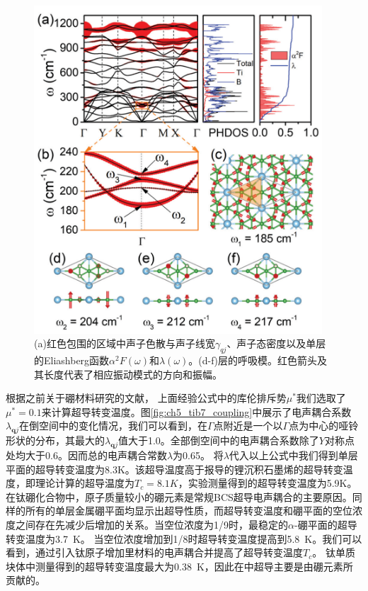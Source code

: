 \begin{figure}
  \includegraphics[width=0.96\textwidth]{figs/ch5_tib7_sc_all.png}
  \centering
  \caption{(a)红色包围的区域中声子色散与声子线宽$\gamma_{qj}$、声子态密度以及单层的Eliashberg函数$\alpha^2 F(\omega)$和$\lambda(\omega)$。(d-f)层的呼吸模。红色箭头及其长度代表了相应振动模式的方向和振幅。}
  \label{fig:ch5_tib7_sc_all}
\end{figure}

根据之前关于硼材料研究的文献\cite{penev2016can,zhao2016superconductivity,zhao2018multigap,liao2017phonon,yan2020superconductivity}，
上面经验公式中的库伦排斥势$\mu^*$我们选取了$\mu^*=0.1$来计算超导转变温度。图\ref{fig:ch5_tib7_coupling}中展示了电声耦合系数$\lambda_{\bm{q}j}$在倒空间中的变化情况，我们可以看到，在$\Gamma$点附近是一个以$\Gamma$点为中心的哑铃形状的分布，其最大的$\lambda_{\bm{q}j}$值大于\num{1.0}。全部倒空间中的电声耦合系数除了$Y$对称点处均大于\num{0.6}。因而总的电声耦合常数$\lambda$为\num{0.65}。
将$\lambda$代入以上公式中我们得到单层平面的超导转变温度为\num{8.3}K。该超导温度高于报导的锂沉积石墨烯的超导转变温度，即理论计算的超导温度为$T_c=8.1K$\cite{profeta2012phonon}，实验测量得到的超导转变温度为\num{5.9}K\cite{ludbrook2015evidence}。
在钛硼化合物中，原子质量较小的硼元素是常规BCS超导电声耦合的主要原因。同样的所有的单层金属硼平面均显示出超导性质，而超导转变温度和硼平面的空位浓度之间存在先减少后增加的关系。当空位浓度为\num{1/9}时，最稳定的$\alpha$-硼平面的超导转变温度为\SI{3.7}{\kelvin}。
当空位浓度增加到\num{1/8}时超导转变温度提高到\SI{5.8}{\kelvin}。我们可以看到，通过引入钛原子增加里材料的电声耦合并提高了超导转变温度$T_c$。
钛单质块体中测量得到的超导转变温度最大为\SI{0.38}{\kelvin}\cite{matthias1963superconductivity}，因此在中超导主要是由硼元素所贡献的。

